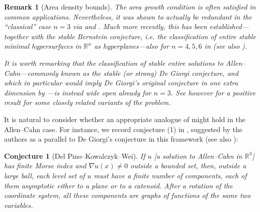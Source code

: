 \documentclass{article}
\newcommand{\R}{\mathbb{R}}
\newtheorem*{remarkx}{Remark}
\newtheorem{lconjecture}{Conjecture} %
\theoremstyle{definition}
\begin{document}
\begin{remarkx}[Area density bounds]
    The area growth condition is often satisfied in common applications. Nevertheless, it was shown to actually be redundant in the ``classical'' case $n=3$ via \cite{DP79,FS80, Pog81} and \cite{Gul86,FC85,Osserman1964}. Much more recently, this has been established---together with the stable Bernstein conjecture, i.e. the classification of entire stable minimal hypersurfaces in $\R^n$ as hyperplanes---also for $n=4,5,6$ in \cite{CL24,CLMS25,Maz24} (see also \cite{CL23,CMR24}).

    It is worth remarking that the classification of stable entire solutions to Allen--Cahn---commonly known as the stable (or strong) De Giorgi conjecture, and which in particular would imply De Giorgi's original conjecture in one extra dimension by \cite{Jerison-Monneau,Sav09}---is instead wide open already for $n=3$. See however \cite{FS20, CFFS25} for a positive result for some closely related variants of the problem.
\end{remarkx}

It is natural to consider whether an appropriate analogue of  might hold in the Allen--Cahn case. For instance, we record conjecture (1) in \cite[p. 127]{dPKW13}, suggested by the authors as a parallel to De Giorgi's conjecture in this framework (see also \cite{dPKW2009survey, dPKW12}):
\begin{lconjecture}[Del Pino--Kowalczyk--Wei]\label{conj:dPKW}
    If $u$ [a solution to Allen--Cahn in $\R^3$] has finite Morse index and $\nabla u(x)\neq 0$ outside a bounded set, then, outside a large ball, each level set of $u$ must have a finite number of components, each of them asymptotic either to a plane or to a catenoid. After a rotation of the coordinate system, all these components are graphs of functions of the same two variables.
\end{lconjecture}
\end{document}
